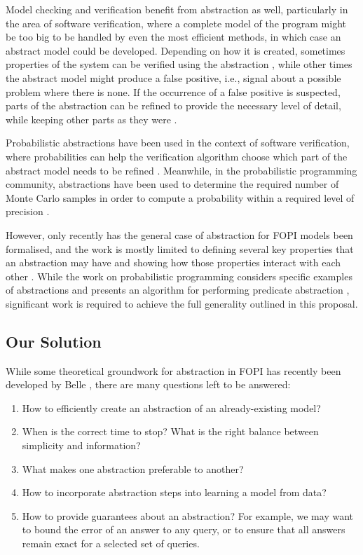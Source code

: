 \documentclass{article}
\begin{document}
Model checking and verification benefit from abstraction as well, particularly
in the area of software verification, where a complete model of the program
might be too big to be handled by even the most efficient methods, in which
case an abstract model could be developed. Depending on how it is created,
sometimes properties of the system can be verified using the abstraction
\cite{DBLP:journals/toplas/ClarkeGL94}, while other times the abstract model
might produce a false positive, i.e., signal about a possible problem where
there is none. If the occurrence of a false positive is suspected, parts of the
abstraction can be refined to provide the necessary level of detail, while
keeping other parts as they were
\cite{DBLP:conf/cav/ClarkeGJLV00,DBLP:conf/popl/HenzingerJMS02}.

Probabilistic abstractions have been used in the context of software
verification, where probabilities can help the verification algorithm choose
which part of the abstract model needs to be refined
\cite{DBLP:conf/pldi/ZhangSN17}. Meanwhile, in the probabilistic programming
community, abstractions have been used to determine the required number of Monte
Carlo samples in order to compute a probability within a required level of
precision \cite{DBLP:conf/popl/Monniaux01}.

However, only recently has the general case of abstraction for FOPI models been
formalised, and the work is mostly limited to defining several key properties
that an abstraction may have and showing how those properties interact with each
other \cite{DBLP:journals/corr/abs-1810-02434}. While the work on probabilistic
programming considers specific examples of abstractions
\cite{DBLP:conf/uai/HoltzenMB17} and presents an algorithm for performing
predicate abstraction \cite{DBLP:conf/icml/HoltzenBM18}, significant work is
required to achieve the full generality outlined in this proposal.

\subsection{Our Solution} \label{section:our_solution}

While some theoretical groundwork for abstraction in FOPI has recently been
developed by Belle \cite{DBLP:journals/corr/abs-1810-02434}, there are many
questions left to be answered:
\begin{enumerate}
\item How to efficiently create an abstraction of an already-existing
  model? \label{q:1}
\item When is the correct time to stop? What is the right balance between
  simplicity and information? \label{q:2}
\item What makes one abstraction preferable to another? \label{q:3}
\item How to incorporate abstraction steps into learning a model from
  data? \label{q:4}
\item How to provide guarantees about an abstraction? For example, we may want
  to bound the error of an answer to any query, or to ensure that all answers
  remain exact for a selected set of queries. \label{q:5}
\end{enumerate}
\end{document}
